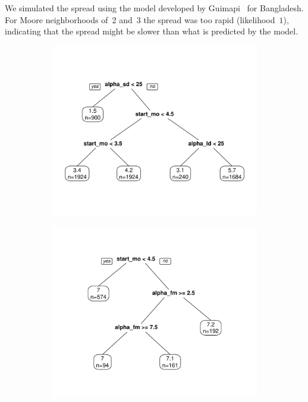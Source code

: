 \documentclass[11pt]{article}
\theoremstyle{definition}
\begin{document}
We simulated the spread using the model developed by
Guimapi~\cite{guimapi2016modeling} for Bangladesh.  For Moore neighborhoods
of~2 and~3 the spread was too rapid (likelihood~$1$), indicating that the
spread might be slower than what is predicted by the model.

\begin{figure}[ht]
    \centering
    \begin{subfigure}[b]{.48\textwidth}
    \includegraphics[width=\textwidth]{figs/cart_analysis1.pdf}
    \caption{\label{fig:cart1}}
    \end{subfigure}
    \begin{subfigure}[b]{.48\textwidth}
    \includegraphics[width=\textwidth]{figs/cart_analysis2.pdf}

\end{subfigure}
\end{figure}
\end{document}
